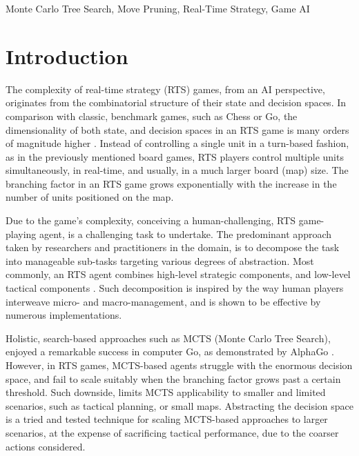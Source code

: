 \documentclass[conference]{IEEEtran}
\begin{document}
\begin{IEEEkeywords}
Monte Carlo Tree Search, Move Pruning, Real-Time Strategy, Game AI
\end{IEEEkeywords}



\section{Introduction}
\label{sec:introduction}

The complexity of real-time strategy (RTS) games, from an AI perspective, originates from the combinatorial structure of their state and decision spaces. In comparison with classic, benchmark games, such as Chess or Go, the dimensionality of both state, and decision spaces in an RTS game is many orders of magnitude higher \cite{ontanon_survey_2013}. Instead of controlling a single unit in a turn-based fashion, as in the previously mentioned board games, RTS players control multiple units simultaneously, in real-time, and usually, in a much larger board (map) size. The branching factor in an RTS game grows exponentially with the increase in the number of units positioned on the map.

Due to the game's complexity, conceiving a human-challenging, RTS game-playing agent, is a challenging task to undertake. The predominant approach taken by researchers and practitioners in the domain, is to decompose the task into manageable sub-tasks targeting various degrees of abstraction. Most commonly, an RTS agent combines high-level strategic components, and low-level tactical components \cite{barriga_combining_2017}. Such decomposition is inspired by the way human players interweave micro- and macro-management, and is shown to be effective by numerous implementations.

Holistic, search-based approaches such as MCTS (Monte Carlo Tree Search), enjoyed a remarkable success in computer Go, as demonstrated by AlphaGo \cite{silver_mastering_2016}. However, in RTS games, MCTS-based agents struggle with the enormous decision space, and fail to scale suitably when the branching factor grows past a certain threshold. Such downside, limits MCTS applicability to smaller and limited scenarios, such as tactical planning, or small maps. Abstracting the decision space is a tried and tested technique for scaling MCTS-based approaches to larger scenarios, at the expense of sacrificing tactical performance, due to the coarser actions considered.
\end{document}
